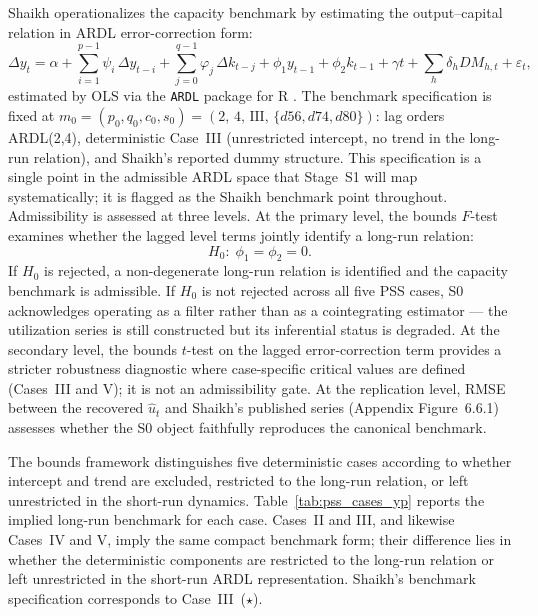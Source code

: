 \documentclass[11pt,a4paper]{article}
\begin{document}

Shaikh operationalizes the capacity benchmark by estimating the
output--capital relation in ARDL error-correction form:
%
\begin{equation}
	\label{eq:S0_ecm}
	\Delta y_t
	=
	\alpha
	+ \sum_{i=1}^{p-1} \psi_i\,\Delta y_{t-i}
	+ \sum_{j=0}^{q-1} \varphi_j\,\Delta k_{t-j}
	+ \phi_1 y_{t-1}
	+ \phi_2 k_{t-1}
	+ \gamma t
	+ \sum_h \delta_h DM_{h,t}
	+ \varepsilon_t,
\end{equation}
%
estimated by OLS via the \texttt{ARDL} package for \textsf{R}
\citep{Natsiopoulos2024}. The benchmark specification is fixed at
$m_0 = (p_0, q_0, c_0, s_0) = (2,\, 4,\, \text{III},\, \{d56, d74, d80\})$:
lag orders ARDL(2,4), deterministic Case~III (unrestricted intercept, no
trend in the long-run relation), and Shaikh's reported dummy structure.
This specification is a single point in the admissible ARDL space that
Stage~S1 will map systematically; it is flagged as the Shaikh benchmark
point throughout. Admissibility is assessed at three levels. At the primary
level, the bounds $F$-test examines whether the lagged level terms jointly
identify a long-run relation:
%
\begin{equation}
	\label{eq:S0_admissibility}
	H_0:\; \phi_1 = \phi_2 = 0.
\end{equation}
%
If $H_0$ is rejected, a non-degenerate long-run relation is identified and
the capacity benchmark is admissible. If $H_0$ is not rejected across all
five PSS cases, S0 acknowledges operating as a filter rather than as a
cointegrating estimator --- the utilization series is still constructed but
its inferential status is degraded. At the secondary level, the bounds
$t$-test on the lagged error-correction term provides a stricter robustness
diagnostic where case-specific critical values are defined (Cases~III and
V); it is not an admissibility gate. At the replication level, RMSE
between the recovered $\widehat{u}_t$ and Shaikh's published series
(Appendix Figure~6.6.1) assesses whether the S0 object faithfully
reproduces the canonical benchmark.


The bounds framework distinguishes five deterministic cases according to
whether intercept and trend are excluded, restricted to the long-run
relation, or left unrestricted in the short-run dynamics. Table~\ref{tab:pss_cases_yp}
reports the implied long-run benchmark for each case. Cases~II and III,
and likewise Cases~IV and V, imply the same compact benchmark form; their
difference lies in whether the deterministic components are restricted to
the long-run relation or left unrestricted in the short-run ARDL
representation. Shaikh's benchmark specification corresponds to
Case~III~($\star$).
\end{document}
